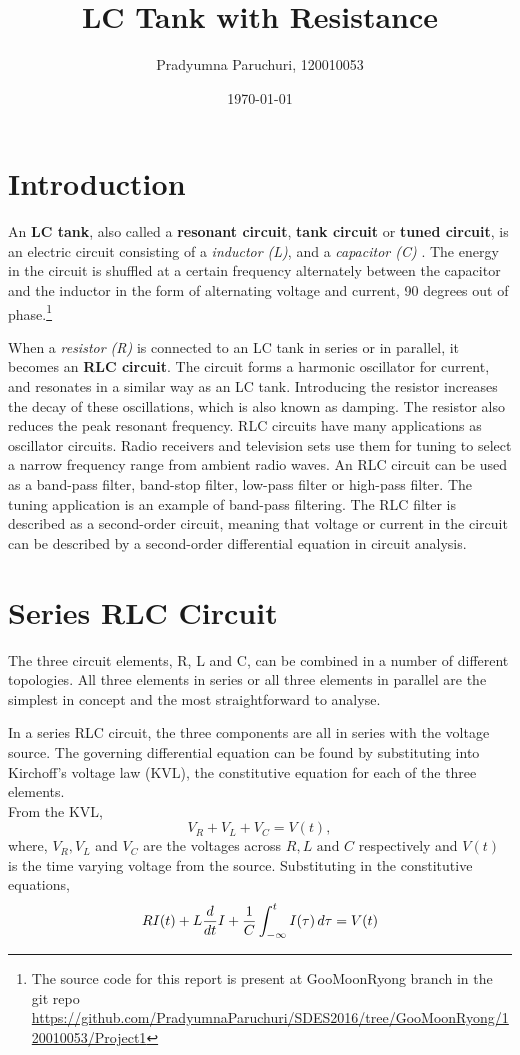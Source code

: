 \documentclass[12pt, twosides]{article}
\title{LC Tank with Resistance}
\date{\today}
\author{Pradyumna Paruchuri, 120010053}
\newcommand{\voltage}{\ensuremath{V}}
\newcommand{\curr}{I}
\newcommand{\res}{R}
\newcommand{\capc}{C}
\newcommand{\ind}{L}
\newcommand{\der}[1]{
\ifnum#1=1
	\frac{d}{dt}
\else
	\frac{d^#1}{dt^#1}
\fi
}
\begin{document}
	\maketitle
	
	\section{Introduction}
		An \textbf{LC tank}, also called a \textbf{resonant circuit}, \textbf{tank circuit} or \textbf{tuned circuit}, is an electric circuit consisting of a \textit{inductor (L)}, and a \textit{capacitor (C)} \cite{Wikipedia}. The energy in the circuit is shuffled at a certain frequency alternately between the capacitor and the inductor in the form of alternating voltage and current, 90 degrees out of phase.\footnote{\label{source} The source code for this report is present at GooMoonRyong branch in the git repo \url{https://github.com/PradyumnaParuchuri/SDES2016/tree/GooMoonRyong/120010053/Project1} }

		When a \textit{resistor (R)} is connected to an LC tank in series or in parallel, it becomes an \textbf{RLC circuit}. The circuit forms a harmonic oscillator for current, and resonates in a similar way as an LC tank. Introducing the resistor increases the decay of these oscillations, which is also known as damping. The resistor also reduces the peak resonant frequency.
		RLC circuits have many applications as oscillator circuits. Radio receivers and television sets use them for tuning to select a narrow frequency range from ambient radio waves. An RLC circuit can be used as a band-pass filter, band-stop filter, low-pass filter or high-pass filter. The tuning application is an example of band-pass filtering. The RLC filter is described as a second-order circuit, meaning that voltage or current in the circuit can be described by a second-order differential equation in circuit analysis.

	\section{Series RLC Circuit}

		The three circuit elements, R, L and C, can be combined in a number of different topologies. All three elements in series or all three elements in parallel are the simplest in concept and the most straightforward to analyse.

		In a series RLC circuit, the three components are all in series with the voltage source. The governing differential equation can be found by substituting into Kirchoff's voltage law (KVL), the constitutive equation for each of the three elements.\\
		From the KVL,
		\[ \voltage_{R} + \voltage_{L} + \voltage_{C} = \voltage(t),\]
		where, \(\voltage_R, \voltage_L\) and \(\voltage_C\) are the voltages across \(\res, \ind \text{ and } \capc\) respectively and \(\voltage(t)\) is the time varying voltage from the source. Substituting in the constitutive equations,
		\begin{equation}
		\label{e:series RLC cur}
			\res \curr(t) + \ind \der{1} \curr + \frac{1}{\capc} \int_{-\infty}^{t} I(\tau)\, d\tau = \voltage(t)
		\end{equation}
		
\end{document}

